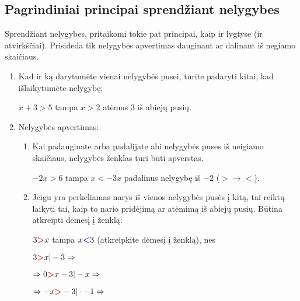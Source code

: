 \documentclass[a4paper]{article}
\begin{document}
\subsection{Pagrindiniai principai sprendžiant nelygybes}

Sprendžiant nelygybes, pritaikomi tokie pat principai, kaip ir lygtyse (ir
atvirkščiai).
Prisideda tik nelygybės apvertimas dauginant ar dalinant iš negiamo skaičiaus.

\begin{enumerate}
      \item Kad ir ką darytumėte vienai nelygybės pusei, turite padaryti kitai,
            kad išlaikytumėte nelygybę;

            $x+3>5$ tampa $x>2$ atėmus 3 iš abiejų pusių.

      \item Nelygybės apvertimas:

            \begin{enumerate}[label*=\arabic*.]

                  \item Kai padauginate arba padalijate abi nelygybės puses iš
                        neigiamo skaičiaus, nelygybės ženklas turi būti
                        apverstas.

                        $-2x>6$ tampa $x<-3x$ padalinus nelygybę iš $-2$
                        ($\boldsymbol{>} \rightarrow \boldsymbol{<}$).

                  \item Jeigu yra perkeliamas narys iš vienos nelygybės pusės į
                        kitą, tai reiktų laikyti tai, kaip to nario pridėjimą
                        ar
                        atėmimą iš abiejų
                        pusių. Būtina atkreipti dėmesį į ženklą:

                        $3\boldsymbol{\textcolor{red}{>}}x$ tampa
                        $x\boldsymbol{\textcolor{blue}{<}}3$ (atkreipkite
                        dėmesį į
                        ženklą), nes

                        $3\boldsymbol{\textcolor{red}{>}}x |-3 \Rightarrow$

                        $\Rightarrow 0\boldsymbol{\textcolor{red}{>}}x-3|-x
                              \Rightarrow$

                        $\Rightarrow
                              -x\boldsymbol{\textcolor{red}{>}}-3|\cdot-1
                              \Rightarrow$


\end{enumerate}
\end{enumerate}
\end{document}
